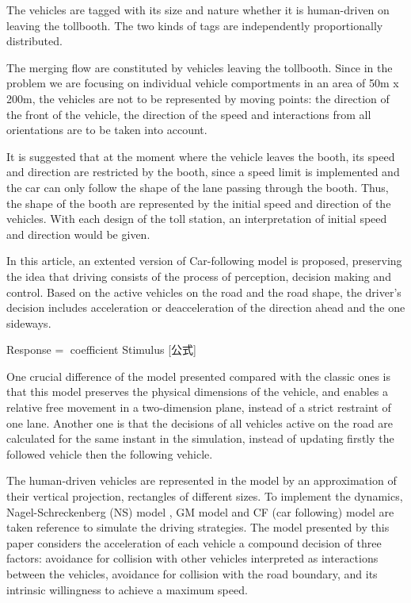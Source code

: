 \documentclass{mcmthesis}
\begin{document}
The vehicles are tagged with its size and nature whether it is human-driven on leaving the tollbooth. The two kinds of tags are independently proportionally distributed.

The merging flow are constituted by vehicles leaving the tollbooth. Since in the problem we are focusing on individual vehicle comportments in an area of 50m x 200m, the vehicles are not to be represented by moving points: the direction of the front of the vehicle, the direction of the speed and interactions from all orientations are to be taken into account.

It is suggested that at the moment where the vehicle leaves the booth, its speed and direction are restricted by the booth, since a speed limit is implemented and the car can only follow the shape of the lane passing through the booth. Thus, the shape of the booth are represented by the initial speed and direction of the vehicles. With each design of the toll station, an interpretation of initial speed and direction would be given.

In this article, an extented version of Car-following model is proposed, preserving the idea that driving consists of the process of perception, decision making and control. Based on the active vehicles on the road and the road shape, the driver's decision includes acceleration or deacceleration of the direction ahead and the one sideways.

Response = coefficient Stimulus [公式]

One crucial difference of the model presented compared with the classic ones is that this model preserves the physical dimensions of the vehicle, and enables a relative free movement in a two-dimension plane, instead of a strict restraint of one lane. Another one is that the decisions of all vehicles active on the road are calculated for the same instant in the simulation, instead of updating firstly the followed vehicle then the following vehicle.

The human-driven vehicles are represented in the model by an approximation of their vertical projection, rectangles of different sizes. To implement the dynamics, Nagel-Schreckenberg (NS) model \cite{acelluar}, GM model and CF (car following) model are taken reference to simulate the driving strategies. The model presented by this paper considers the acceleration of each vehicle a compound decision of three factors: avoidance for collision with other vehicles interpreted as interactions between the vehicles, avoidance for collision with the road boundary, and its intrinsic willingness to achieve a maximum speed. 
\end{document}
